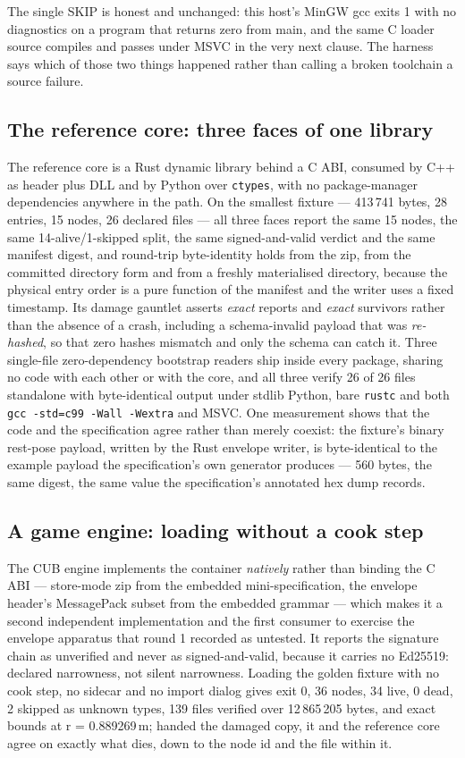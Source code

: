 \documentclass[10pt,twocolumn,letterpaper]{article}
\newcommand{\code}[1]{\texttt{\small #1}}
\begin{document}
The single SKIP is honest and unchanged: this host's MinGW gcc exits 1 with no diagnostics on a program that returns zero from main, and the same C loader source compiles and passes under MSVC in the very next clause. The harness says which of those two things happened rather than calling a broken toolchain a source failure.

\subsection{The reference core: three faces of one library}

The reference core is a Rust dynamic library behind a C ABI, consumed by C++ as header plus DLL and by Python over \code{ctypes}, with no package-manager dependencies anywhere in the path. On the smallest fixture --- 413\,741 bytes, 28 entries, 15 nodes, 26 declared files --- all three faces report the same 15 nodes, the same 14-alive/1-skipped split, the same signed-and-valid verdict and the same manifest digest, and round-trip byte-identity holds from the zip, from the committed directory form and from a freshly materialised directory, because the physical entry order is a pure function of the manifest and the writer uses a fixed timestamp. Its damage gauntlet asserts \emph{exact} reports and \emph{exact} survivors rather than the absence of a crash, including a schema-invalid payload that was \emph{re-hashed}, so that zero hashes mismatch and only the schema can catch it. Three single-file zero-dependency bootstrap readers ship inside every package, sharing no code with each other or with the core, and all three verify 26 of 26 files standalone with byte-identical output under stdlib Python, bare \code{rustc} and both \code{gcc -std=c99 -Wall -Wextra} and MSVC. One measurement shows that the code and the specification agree rather than merely coexist: the fixture's binary rest-pose payload, written by the Rust envelope writer, is byte-identical to the example payload the specification's own generator produces --- 560 bytes, the same digest, the same value the specification's annotated hex dump records.

\subsection{A game engine: loading without a cook step}

The CUB engine implements the container \emph{natively} rather than binding the C ABI --- store-mode zip from the embedded mini-specification, the envelope header's MessagePack subset from the embedded grammar --- which makes it a second independent implementation and the first consumer to exercise the envelope apparatus that round 1 recorded as untested. It reports the signature chain as unverified and never as signed-and-valid, because it carries no Ed25519: declared narrowness, not silent narrowness. Loading the golden fixture with no cook step, no sidecar and no import dialog gives exit 0, 36 nodes, 34 live, 0 dead, 2 skipped as unknown types, 139 files verified over 12\,865\,205 bytes, and exact bounds at r = 0.889269\,m; handed the damaged copy, it and the reference core agree on exactly what dies, down to the node id and the file within it.
\end{document}
